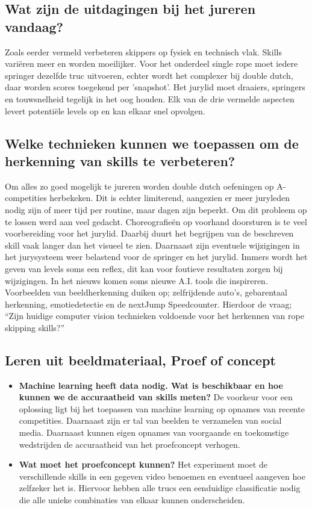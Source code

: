 \subsection{Wat zijn de uitdagingen bij het jureren vandaag?}

Zoals eerder vermeld verbeteren skippers op fysiek en technisch vlak. Skills variëren meer en worden moeilijker. Voor het onderdeel single rope moet iedere springer dezelfde truc uitvoeren, echter wordt het complexer bij double dutch, daar worden scores toegekend per 'snapshot'. Het jurylid moet draaiers, springers en touwsnelheid tegelijk in het oog houden. Elk van de drie vermelde aspecten levert potentiële levels op en kan elkaar snel opvolgen.

\subsection{Welke technieken kunnen we toepassen om de herkenning van skills te verbeteren?}

Om alles zo goed mogelijk te jureren worden double dutch oefeningen op A-competities herbekeken. Dit is echter limiterend, aangezien er meer juryleden nodig zijn of meer tijd per routine, maar dagen zijn beperkt.
Om dit probleem op te lossen werd aan veel gedacht. Choreografieën op voorhand doorsturen is te veel voorbereiding voor het jurylid. Daarbij duurt het begrijpen van de beschreven skill vaak langer dan het visueel te zien.
Daarnaast zijn eventuele wijzigingen in het jurysysteem weer belastend voor de springer en het jurylid. Immers wordt het geven van levels soms een reflex, dit kan voor foutieve resultaten zorgen bij wijzigingen.
In het nieuws komen soms nieuwe A.I. tools die inspireren. Voorbeelden van beeldherkenning duiken op; zelfrijdende auto's, gebarentaal herkenning, emotiedetectie en de nextJump Speedcounter. Hierdoor de vraag; ``Zijn huidige computer vision technieken voldoende voor het herkennen van rope skipping skills?''

\subsection{Leren uit beeldmateriaal, Proef of concept}
\begin{itemize}
    \item \textbf{Machine learning heeft data nodig. Wat is beschikbaar en hoe kunnen we de accuraatheid van skills meten?}
    De voorkeur voor een oplossing ligt bij het toepassen van machine learning op opnames van recente competities. Daarnaast zijn er tal van beelden te verzamelen van social media. Daarnaast kunnen eigen opnames van voorgaande en toekomstige wedstrijden de accuraatheid van het proefconcept verhogen.
    
    \item \textbf{Wat moet het proefconcept kunnen?}
    Het experiment moet de verschillende skills in een gegeven video benoemen en eventueel aangeven hoe zelfzeker het is. Hiervoor hebben alle trucs een eenduidige classificatie nodig die alle unieke combinaties van elkaar kunnen onderscheiden.
\end{itemize}

